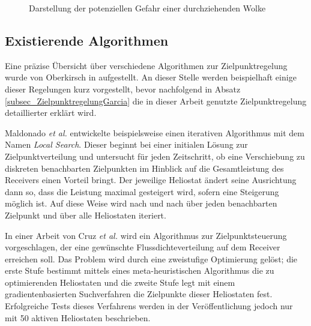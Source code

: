 \begin{figure}[h!]
    \centering
    \setlength{\fboxsep}{1pt}
    \setlength{\fboxrule}{1pt}
    \caption[Darstellung der potenziellen Gefahr einer durchziehenden Wolke]{Darstellung der potenziellen Gefahr einer durchziehenden Wolke}
    \label{fig_EinflussWolke}
\end{figure}

\subsection{Existierende Algorithmen} \label{subsec_ZielpunktregelungLiteratur}
Eine präzise Übersicht über verschiedene Algorithmen zur Zielpunktregelung wurde von Oberkirsch in \cite{DissOberkirsch} aufgestellt.
An dieser Stelle werden beispielhaft einige dieser Regelungen kurz vorgestellt, bevor nachfolgend in Absatz \ref{subsec_ZielpunktregelungGarcia} die in dieser Arbeit genutzte Zielpunktregelung detaillierter erklärt wird.

Maldonado \textit{et al.} \cite{Maldonado}\cite{Maldonado2} entwickelte beispielsweise einen iterativen Algorithmus mit dem Namen \textit{Local Search}.
Dieser beginnt bei einer initialen Lösung zur Zielpunktverteilung und untersucht für jeden Zeitschritt, ob eine Verschiebung zu diskreten benachbarten Zielpunkten im Hinblick auf die Gesamtleistung des Receivers einen Vorteil bringt.
Der jeweilige Heliostat ändert seine Ausrichtung dann so, dass die Leistung maximal gesteigert wird, sofern eine Steigerung möglich ist.
Auf diese Weise wird nach und nach über jeden benachbarten Zielpunkt und über alle Heliostaten iteriert.

In einer Arbeit von Cruz \textit{et al.} \cite{Cruz} wird ein Algorithmus zur Zielpunktsteuerung vorgeschlagen, der eine gewünschte Flussdichteverteilung auf dem Receiver erreichen soll.
Das Problem wird durch eine zweistufige Optimierung gelöst; die erste Stufe bestimmt mittels eines meta-heuristischen Algorithmus die zu optimierenden Heliostaten und die zweite Stufe legt mit einem gradientenbasierten Suchverfahren die Zielpunkte dieser Heliostaten fest. Erfolgreiche Tests dieses Verfahrens werden in der Veröffentlichung jedoch nur mit 50 aktiven Heliostaten beschrieben.


